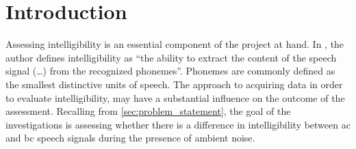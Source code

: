 \section{Introduction}\label{sec:method_intro}
Assessing intelligibility is an essential component of the project at hand. 
In \citep[p. 11]{cote_2011}, the author defines intelligibility as \enquote{the ability to extract the content of the speech signal (\dots) from the recognized phonemes}. Phonemes are commonly defined as the smallest distinctive units of speech.
The approach to acquiring data in order to evaluate intelligibility, may have a substantial influence on the outcome of the assessment.
Recalling from \autoref{sec:problem_statement}, the goal of the investigations is assessing whether there is a difference in intelligibility between \gls{ac} and \gls{bc} speech signals during the presence of ambient noise. 

